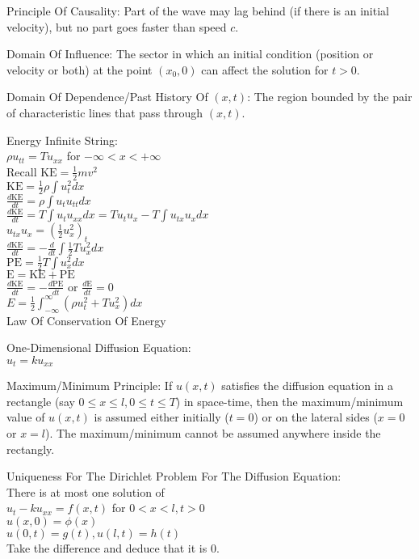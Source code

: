 Principle Of Causality: Part of the wave may lag behind (if there is an initial velocity), but no part goes faster than speed $c$.

Domain Of Influence: The sector in which an initial condition (position or velocity or both) at the point $(x_0,0)$ can affect the solution for $t > 0$.

Domain Of Dependence/Past History Of $(x,t)$: The region bounded by the pair of characteristic lines that pass through $(x,t)$.

Energy Infinite String: \\
$\rho u_{tt}=T u_{xx}$ for $ -\infty < x < +\infty$ \\
Recall $\text{KE}=\frac{1}{2}mv^2$ \\
$\text{KE} = \frac{1}{2} \rho \int u_t^2 dx$ \\
$\frac{d\text{KE}}{dt} = \rho \int u_t u_{tt} dx$ \\
$\frac{d\text{KE}}{dt} = T \int u_t u_{xx} dx = T u_t u_x - T \int u_{tx} u_x dx$ \\
$u_{tx} u_x = \left(\frac{1}{2}u_x^2 \right)_t$ \\
$\frac{d\text{KE}}{dt} = -\frac{d}{dt} \int \frac{1}{2} T u_x^2 dx$ \\
$\text{PE} = \frac{1}{2} T \int u_x^2 dx$ \\
$\text{E}=\text{KE}+\text{PE}$ \\
$\frac{d\text{KE}}{dt}=-\frac{d\text{PE}}{dt}$ or $\frac{d\text{E}}{dt}=0$ \\
$E = \frac{1}{2} \int_{-\infty}^{\infty} (\rho u_t^2 + T u_x^2) dx$ \\
Law Of Conservation Of Energy

One-Dimensional Diffusion Equation: \\
$u_t = k u_{xx}$

Maximum/Minimum Principle: If $u(x,t)$ satisfies the diffusion equation in a rectangle (say $0 \le x \le l, 0 \le t \le T$) in space-time, then the maximum/minimum value of $u(x,t)$ is assumed either initially ($t=0$) or on the lateral sides ($x=0$ or $x=l$). The maximum/minimum cannot be assumed anywhere inside the rectangly.

Uniqueness For The Dirichlet Problem For The Diffusion Equation: \\
There is at most one solution of \\
$u_t-ku_{xx}=f(x,t)$ for $ 0<x<l, t>0$ \\
$u(x,0)=\phi (x)$ \\
$u(0,t)=g(t), u(l,t)=h(t)$ \\
Take the difference and deduce that it is $0$.

